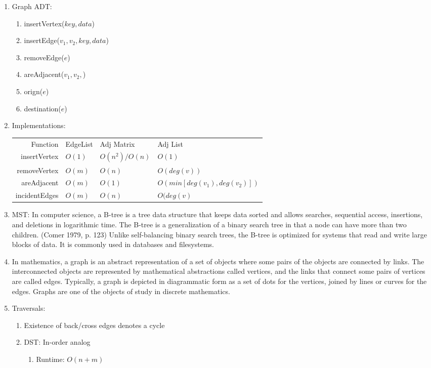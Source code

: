 \documentclass[12pt]{article}
\renewcommand{\=}[1]{\stackrel{#1}{=}} %
\theoremstyle{definition}
\theoremstyle{remark}
\begin{document}
\begin{enumerate}
\begin{enumerate}
    \item Graph ADT:
      \begin{enumerate}
      \item insertVertex($key, data$)
      \item insertEdge($v_1,v_2,key,data$)
      \item removeEdge($e$)
      \item areAdjacent($v_1,v_2,$)
      \item orign($e$)
      \item destination($e$)
      \end{enumerate}

    \item Implementations: 
      \begin{tabular}{ r l l l }
        Function & EdgeList & Adj Matrix & Adj List \\
        insertVertex & $O(1)$ & $O(n^2)/O(n)$ & $O(1)$ \\
        removeVertex & $O(m)$ & $O(n)$ & $O(deg(v))$ \\
        areAdjacent & $O(m)$ & $O(1)$ & $O(min[deg(v_1),deg(v_2)])$\\
        incidentEdges & $O(m)$ & $O(n)$ & $O(deg(v)$\\
      \end{tabular}


    \item MST: In computer science, a B-tree is a tree data structure that keeps data sorted and allows searches, sequential access, insertions, and deletions in logarithmic time. The B-tree is a generalization of a binary search tree in that a node can have more than two children. (Comer 1979, p. 123) Unlike self-balancing binary search trees, the B-tree is optimized for systems that read and write large blocks of data. It is commonly used in databases and filesystems.
    \item In mathematics, a graph is an abstract representation of a set of objects where some pairs of the objects are connected by links. The interconnected objects are represented by mathematical abstractions called vertices, and the links that connect some pairs of vertices are called edges. Typically, a graph is depicted in diagrammatic form as a set of dots for the vertices, joined by lines or curves for the edges. Graphs are one of the objects of study in discrete mathematics.
    \item Traversals:
      \begin{enumerate}
      \item Existence of back/cross edges denotes a cycle
      \item DST: In-order analog
        \begin{enumerate}
        \item Runtime: $O(n+m)$
        \end{enumerate}


\end{enumerate}
\end{enumerate}
\end{enumerate}
\end{document}
